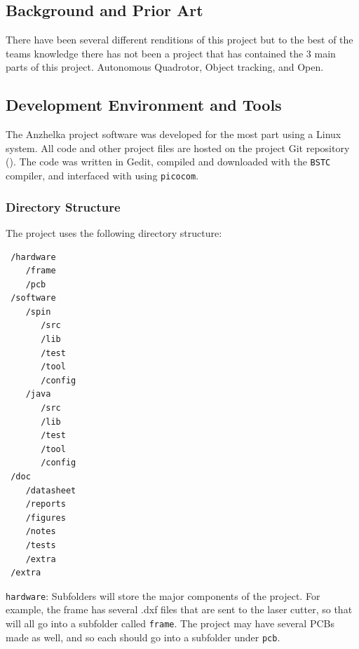 \documentclass{article}
\numberwithin{equation}{section} %
\begin{document}
\subsection{Background and Prior Art}
There have been several different renditions of this project but to the best of the teams knowledge there has not been a project that has contained the 3 main parts of this project. Autonomous Quadrotor, Object tracking, and Open.

\subsection{Development Environment and Tools}

The Anzhelka project software was developed for the most part using a Linux system. All code and other project files are hosted on the project Git repository (\cite{anzhelka_code}). The 
 code was written in Gedit, compiled and downloaded with the \texttt{BSTC} compiler, and interfaced with using \texttt{picocom}.


\subsubsection{Directory Structure}

The project uses the following directory structure:
\begin{lstlisting}
 /hardware 
    /frame 
    /pcb 
 /software 
    /spin 
       /src 
       /lib 
       /test 
       /tool 
       /config 
    /java 
       /src 
       /lib 
       /test 
       /tool 
       /config 
 /doc 
    /datasheet 
    /reports 
    /figures 
    /notes 
    /tests 
    /extra 
 /extra 
\end{lstlisting} 
 
 
\texttt{hardware}:
Subfolders will store the major components of the project. For example, the frame has several .dxf files that are sent to the laser cutter, so that will all go into a subfolder called \texttt{frame}. The project may have several PCBs made as well, and so each should go into a subfolder under \texttt{pcb}. 
\end{document}
